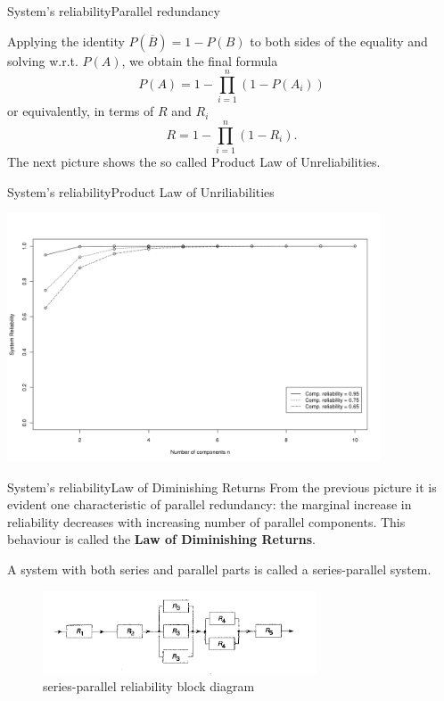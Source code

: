 \documentclass[handout]{beamer}
\begin{document}
\begin{frame}{System's reliability}{Parallel redundancy}
 \begin{example}[continued]
  Applying the identity $P(\overline B)=1-P(B)$ to both sides of the equality and solving w.r.t. $P(A)$, we obtain the final formula
\[
P(A) = 1 - \prod_{i=1}^n (1 - P(A_i)) 
\] 
or equivalently, in terms of $R$ and $R_i$  
\[
 R = 1 - \prod_{i=1}^n (1 - R_i).
\]
The next picture shows the so called Product Law of Unreliabilities.
 \end{example}

\end{frame}

\begin{frame}{System's reliability}{Product Law of Unriliabilities}

\begin{center}
 \includegraphics[width=314pt, keepaspectratio=true]{./parallelRedundancy1.png}
\end{center}
\end{frame}



\begin{frame}{System's reliability}{Law of Diminishing Returns}
From the previous picture it is evident one characteristic of parallel redundancy: the marginal
increase in reliability decreases with increasing number of parallel components. This behaviour
is called the \textbf{Law of Diminishing Returns}.
 \begin{definition}
  A system with both series and parallel parts is called a series-parallel system. 
 \end{definition}
\begin{figure}
 \centering
 \includegraphics[width=230pt, keepaspectratio=true]{./seriesparalleldiagram.png}
 \caption{series-parallel reliability block diagram}
 \label{fig:seriesParallelBlockDiagram}
\end{figure}
\end{frame}
\end{document}
